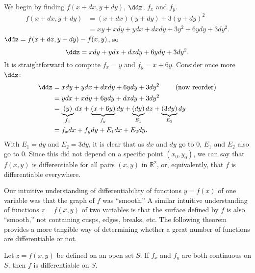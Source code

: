 {We begin by finding $f(x+dx,y+dy)$, $\ddz$, $f_x$ and $f_y$.
\begin{align*}
f(x+dx,y+dy) &= (x+dx)(y+dy) + 3(y+dy)^2 \\
						&= xy + xdy+ydx+dxdy + 3y^2+6ydy+3dy^2.
\end{align*}
$\ddz = f(x+dx,y+dy) - f(x,y)$, so
\[\ddz = xdy + ydx + dxdy + 6ydy+3dy^2.\]
It is straightforward to compute $f_x = y$ and $f_y = x+6y$. Consider once more $\ddz$:
\begin{align*}
\ddz &= xdy + ydx + dxdy + 6ydy+3dy^2 \qquad \text{ (now reorder)}\\
		&= ydx + xdy+6ydy+ dxdy + 3dy^2\\
		&= \underbrace{(y)}_{f_x}dx + \underbrace{(x+6y)}_{f_y}dy + \underbrace{(dy)}_{E_1}dx+\underbrace{(3dy)}_{E_2}dy\\
		&= f_xdx + f_ydy + E_1dx+E_2dy.
\end{align*}
With $E_1 = dy$ and $E_2 = 3dy$, it is clear that as $dx$ and $dy$ go to 0, $E_1$ and $E_2$ also go to 0. Since this did not depend on a specific point $(x_0,y_0)$, we can say that $f(x,y)$ is differentiable for all pairs $(x,y)$ in $\mathbb{R}^2$, or, equivalently, that $f$ is differentiable everywhere. }

Our intuitive understanding of differentiability of functions $y=f(x)$ of one variable was that the graph of $f$ was ``smooth.'' A similar intuitive understanding of functions $z=f(x,y)$ of two variables is that the surface defined by $f$ is also ``smooth,'' not containing cusps, edges, breaks,  etc. The following theorem
provides a more tangible way of determining whether a great number of functions are differentiable or not.


{Let $z=f(x,y)$ be defined on an open set $S$. If $f_x$ and $f_y$ are both continuous on $S$, then $f$ is differentiable on $S$.
}

